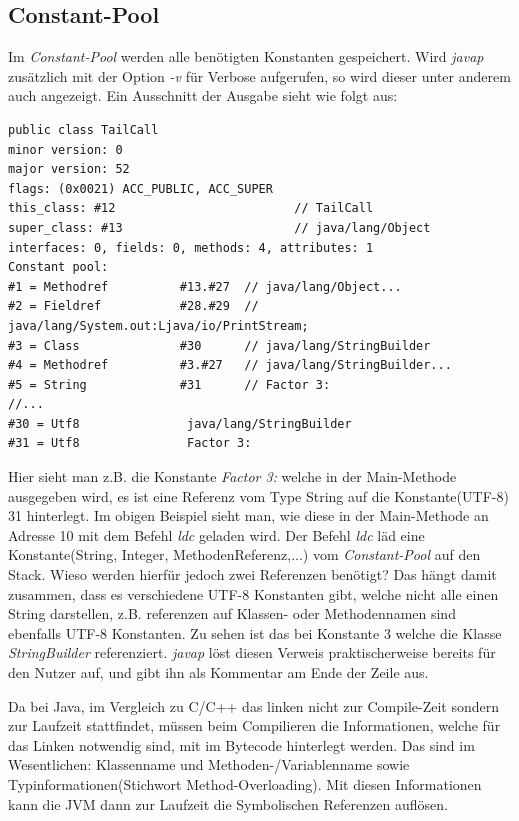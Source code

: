 \documentclass[a4paper, 11pt]{article}
\begin{document}
	\subsection{Constant-Pool}
	Im \textit{Constant-Pool} werden alle benötigten Konstanten gespeichert. Wird \textit{javap} zusätzlich mit der Option \textit{-v} für Verbose aufgerufen, so wird dieser unter anderem auch angezeigt. Ein Ausschnitt der Ausgabe sieht wie folgt aus:
 \lstset{language=JVMIS}
\begin{lstlisting}
public class TailCall
minor version: 0
major version: 52
flags: (0x0021) ACC_PUBLIC, ACC_SUPER
this_class: #12                         // TailCall
super_class: #13                        // java/lang/Object
interfaces: 0, fields: 0, methods: 4, attributes: 1
Constant pool:
#1 = Methodref          #13.#27  // java/lang/Object...
#2 = Fieldref           #28.#29  // java/lang/System.out:Ljava/io/PrintStream;
#3 = Class              #30      // java/lang/StringBuilder
#4 = Methodref          #3.#27   // java/lang/StringBuilder...
#5 = String             #31      // Factor 3:
//...
#30 = Utf8               java/lang/StringBuilder
#31 = Utf8               Factor 3:
\end{lstlisting}	
	Hier sieht man z.B. die Konstante \textit{Factor 3:} welche in der Main-Methode ausgegeben wird, es ist eine Referenz vom Type String auf die Konstante(UTF-8) 31 hinterlegt. Im obigen Beispiel sieht man, wie diese in der Main-Methode an Adresse 10 mit dem Befehl \textit{ldc} geladen wird. Der Befehl \textit{ldc} läd eine Konstante(String, Integer, MethodenReferenz,...) vom \textit{Constant-Pool} auf den Stack. Wieso werden hierfür jedoch zwei Referenzen benötigt? Das hängt damit zusammen, dass es verschiedene UTF-8 Konstanten gibt, welche nicht alle einen String darstellen, z.B. referenzen auf Klassen- oder Methodennamen sind ebenfalls UTF-8 Konstanten. Zu sehen ist das bei Konstante 3 welche die Klasse \textit{StringBuilder} referenziert. \textit{javap} löst diesen Verweis praktischerweise bereits für den Nutzer auf, und gibt ihn als Kommentar am Ende der Zeile aus.
	
	Da bei Java, im Vergleich zu C/C++ das linken nicht zur Compile-Zeit sondern zur Laufzeit stattfindet, müssen beim Compilieren die Informationen, welche für das Linken notwendig sind, mit im Bytecode hinterlegt werden. Das sind im Wesentlichen: Klassenname und Methoden-/Variablenname sowie Typinformationen(Stichwort Method-Overloading).
	Mit diesen Informationen kann die JVM dann zur Laufzeit die Symbolischen Referenzen auflösen. 
	
\end{document}
